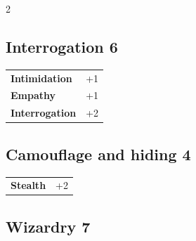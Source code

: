 \begin{multicols}{2}
\begin{tcolorbox}
\vspace{3mm}



\end{tcolorbox}

\begin{tcolorbox}
    \subsection*{Interrogation \hfill \small{6 }}
    \tcblower




\begin{tabular}{@{}ll@{}}
    \textbf{Intimidation} & +1\\
    \textbf{Empathy} & +1\\
    \textbf{Interrogation} & +2\\
\end{tabular}


\end{tcolorbox}

\begin{tcolorbox}
    \subsection*{Camouflage and hiding \hfill \small{4 }}
    \tcblower




\begin{tabular}{@{}ll@{}}
    \textbf{Stealth} & +2\\
\end{tabular}


\end{tcolorbox}

\begin{tcolorbox}
    \subsection*{Wizardry \hfill \small{7 }}
    \tcblower





\end{tcolorbox}
\end{multicols}
